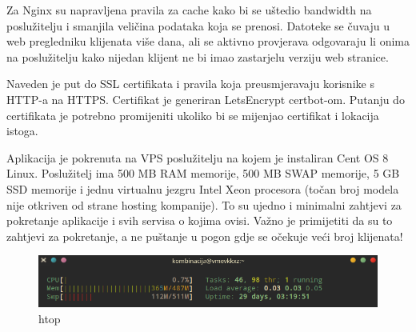		Za Nginx su napravljena pravila za cache kako bi se uštedio bandwidth na poslužitelju i smanjila veličina podataka koja se prenosi. Datoteke se čuvaju u web pregledniku klijenata više dana, ali se aktivno provjerava odgovaraju li onima na poslužitelju kako nijedan klijent ne bi imao zastarjelu verziju web stranice.
		
		Naveden je put do SSL certifikata i pravila koja preusmjeravaju korisnike s HTTP-a na HTTPS. Certifikat je generiran LetsEncrypt certbot-om. Putanju do certifikata je potrebno promijeniti ukoliko bi se mijenjao certifikat i lokacija istoga.\\
		
		
		Aplikacija je pokrenuta na VPS poslužitelju na kojem je instaliran Cent OS 8 Linux. Poslužitelj ima 500 MB RAM memorije, 500 MB SWAP memorije, 5 GB SSD memorije i jednu virtualnu jezgru Intel Xeon procesora (točan broj modela nije otkriven od strane hosting kompanije). To su ujedno i minimalni zahtjevi za pokretanje aplikacije i svih servisa o kojima ovisi. Važno je primijetiti da su to zahtjevi za pokretanje, a ne puštanje u pogon gdje se očekuje veći broj klijenata!
		
		\begin{figure}[H]
					\includegraphics[scale=0.8]{figures/7-htop.PNG}
					\centering
					\caption{htop}
					\label{fig:htop}
				\end{figure} 
		
		\eject 